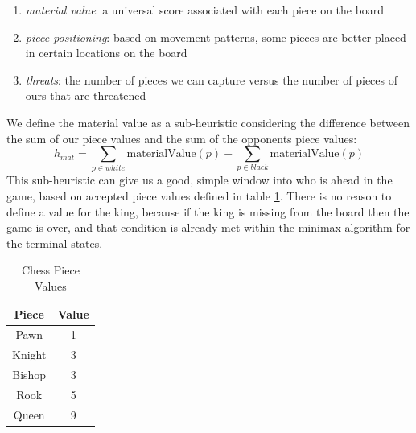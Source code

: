 \documentclass[letterpaper]{article}
\begin{document}
\begin{enumerate}[i]
    \item \textit{material value}: a universal score associated with each piece on the board
    \item \textit{piece positioning}: based on movement patterns, some pieces are better-placed in certain locations on the board
    \item \textit{threats}: the number of pieces we can capture versus the number of pieces of ours that are threatened
\end{enumerate}
We define the material value as a sub-heuristic considering the difference between the sum of our piece values and the sum of the opponents piece values:
$$
h_{mat} = \sum_{p \in white}\text{materialValue}(p) - \sum_{p \in black}\text{materialValue}(p)
$$
This sub-heuristic can give us a good, simple window into who is ahead in the game, based on accepted piece values defined in table \ref{materialValues}. There is no reason to define a value for the king, because if the king is missing from the board then the game is over, and that condition is already met within the minimax algorithm for the terminal states.
\begin{table}[t]
    \centering
    \begin{tabular}{|c|c|}
    \hline
        Piece & Value \\ \hline
        Pawn &  1\\ \hline
        Knight & 3\\ \hline
        Bishop & 3\\ \hline
        Rook & 5\\ \hline
        Queen & 9\\ \hline
    \end{tabular}
    \caption{Chess Piece Values}
    \label{materialValues}
\end{table}
\end{document}
